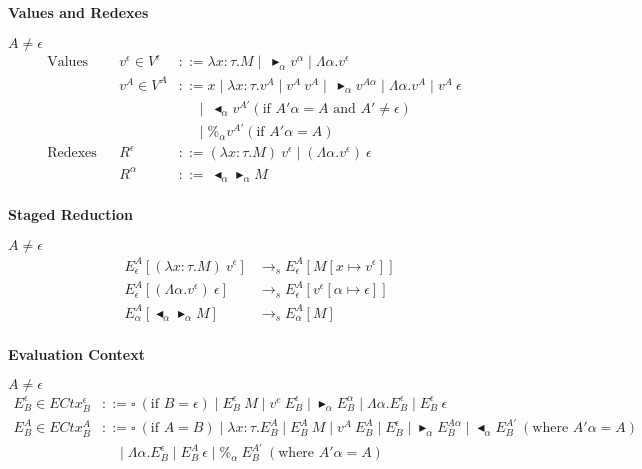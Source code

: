 \documentclass[9pt, a4paper]{extarticle}
\theoremstyle{break}
\newcommand{\figheader}[2]{
  \begin{flushleft}
    #2 {\bf \normalsize #1}
\end{flushleft}}
\newcommand{\TB}{\blacktriangleright}
\newcommand{\TBL}{\blacktriangleleft}
\begin{document}
\figheader{Values and Redexes}{}
$A \neq \epsilon$\\
\begin{align*}
    \textrm{Values} && v^\epsilon \in V^\epsilon & ::= \lambda x:\tau.M \mid\ \TB_\alpha v^\alpha \mid \Lambda\alpha.v^\epsilon & \\
                    && v^A \in V^A & ::= x \mid \lambda x:\tau.v^A \mid v^A\ v^A \mid\ \TB_\alpha v^{A\alpha} 
                                           \mid \Lambda\alpha.v^A \mid v^A\ \epsilon &\\
                                    &&& \quad\   \mid\ \TBL_\alpha v^{A'} (\text{if } A'\alpha = A \text{ and } A' \neq \epsilon) & \\
                                    &&& \quad\   \mid \%_\alpha v^{A'} (\text{if } A'\alpha = A) & \\
    \textrm{Redexes} && R^\epsilon & ::= (\lambda x:\tau.M)\ v^\epsilon \mid (\Lambda\alpha.v^\epsilon)\ \epsilon & \\
                     && R^\alpha & ::=\ \TBL_\alpha \TB_\alpha M & \\
\end{align*}

\figheader{Staged Reduction}{}
$A \neq \epsilon$\\
\begin{align*}
    E^A_\epsilon [(\lambda x:\tau.M)\ v^\epsilon] & \longrightarrow_s E^A_\epsilon[M[x\mapsto v^\epsilon]] \\
    E^A_\epsilon [(\Lambda\alpha.v^\epsilon)\ \epsilon] & \longrightarrow_s E^A_\epsilon[v^\epsilon[\alpha\mapsto \epsilon]] \\
    E^A_\alpha [\TBL_\alpha \TB_\alpha M] & \longrightarrow_s E^A_\alpha[M] \\
\end{align*}

\figheader{Evaluation Context}{}
$A \neq \epsilon$\\
\begin{align*}
    E^\epsilon_B \in ECtx^\epsilon_B & ::= \square\ (\text{if\ } B = \epsilon) \mid E^\epsilon_B\ M \mid v^e\ E^\epsilon_B
                                           \mid \TB_\alpha E^\alpha_B \mid \Lambda\alpha.E^\epsilon_B
                                           \mid E^\epsilon_B\ \epsilon  \\
    E^A_B \in ECtx^A_B & ::= \square\ (\text{if } A = B) \mid \lambda x:\tau.E^A_B \mid E^A_B\ M \mid v^A\ E^A_B
                                           \mid E^\epsilon_B \mid \TB_\alpha E^{A\alpha}_B
                                           \mid \TBL_\alpha E^{A'}_B \ (\text{where } A'\alpha = A) \\
                                           & \quad \mid \Lambda\alpha.E^\epsilon_B
                                           \mid E^A_B\ \epsilon \mid \%_\alpha\ E^{A'}_B \ (\text{where } A'\alpha = A)\\
\end{align*}
\end{document}
